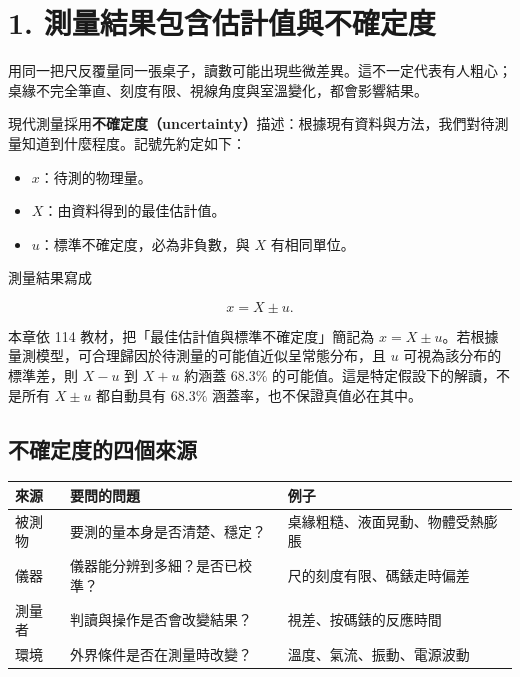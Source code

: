 \documentclass[11pt,a4paper]{article}
\newcounter{none}
\providecommand{\tightlist}{%
  \setlength{\itemsep}{0pt}\setlength{\parskip}{0pt}}
\begin{document}
\section{1. 測量結果包含估計值與不確定度}\label{ux6e2cux91cfux7d50ux679cux5305ux542bux4f30ux8a08ux503cux8207ux4e0dux78baux5b9aux5ea6}

用同一把尺反覆量同一張桌子，讀數可能出現些微差異。這不一定代表有人粗心；桌緣不完全筆直、刻度有限、視線角度與室溫變化，都會影響結果。

現代測量採用\textbf{不確定度（uncertainty）}描述：根據現有資料與方法，我們對待測量知道到什麼程度。記號先約定如下：

\begin{itemize}
\tightlist
\item
  \(x\)：待測的物理量。
\item
  \(X\)：由資料得到的最佳估計值。
\item
  \(u\)：標準不確定度，必為非負數，與 \(X\) 有相同單位。
\end{itemize}

測量結果寫成

\[
\boxed{x=X\pm u}.
\]

本章依 114 教材，把「最佳估計值與標準不確定度」簡記為 \(x=X\pm u\)。若根據量測模型，可合理歸因於待測量的可能值近似呈常態分布，且 \(u\) 可視為該分布的標準差，則 \(X-u\) 到 \(X+u\) 約涵蓋 \(68.3\%\) 的可能值。這是特定假設下的解讀，不是所有 \(X\pm u\) 都自動具有 \(68.3\%\) 涵蓋率，也不保證真值必在其中。

\subsection{不確定度的四個來源}\label{ux4e0dux78baux5b9aux5ea6ux7684ux56dbux500bux4f86ux6e90}

{\def\LTcaptype{none} %
\begin{longtable}[]{@{}
  >{\raggedright\arraybackslash}p{}
  >{\raggedright\arraybackslash}p{}
  >{\raggedright\arraybackslash}p{}@{}}
\toprule\noalign{}
\begin{minipage}[b]{\linewidth}\raggedright
來源
\end{minipage} & \begin{minipage}[b]{\linewidth}\raggedright
要問的問題
\end{minipage} & \begin{minipage}[b]{\linewidth}\raggedright
例子
\end{minipage} \\
\midrule\noalign{}
\endhead
\bottomrule\noalign{}
\endlastfoot
被測物 & 要測的量本身是否清楚、穩定？ & 桌緣粗糙、液面晃動、物體受熱膨脹 \\
儀器 & 儀器能分辨到多細？是否已校準？ & 尺的刻度有限、碼錶走時偏差 \\
測量者 & 判讀與操作是否會改變結果？ & 視差、按碼錶的反應時間 \\
環境 & 外界條件是否在測量時改變？ & 溫度、氣流、振動、電源波動 \\
\end{longtable}
}
\end{document}
